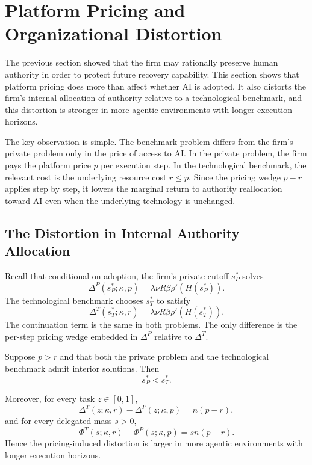 \section{Platform Pricing and Organizational Distortion}
\label{sec:pricing}

The previous section showed that the firm may rationally preserve human authority in order to protect future recovery capability. This section shows that platform pricing does more than affect whether AI is adopted. It also distorts the firm's internal allocation of authority relative to a technological benchmark, and this distortion is stronger in more agentic environments with longer execution horizons.

The key observation is simple. The benchmark problem differs from the firm's private problem only in the price of access to AI. In the private problem, the firm pays the platform price $p$ per execution step. In the technological benchmark, the relevant cost is the underlying resource cost $r\le p$. Since the pricing wedge $p-r$ applies step by step, it lowers the marginal return to authority reallocation toward AI even when the underlying technology is unchanged.

\subsection{The Distortion in Internal Authority Allocation}
\label{subsec:pricing-distortion}

Recall that conditional on adoption, the firm's private cutoff $s_P^\ast$ solves
\[
\Delta^P(s_P^\ast;\kappa,p)=\lambda \nu R \beta \rho'(H(s_P^\ast)).
\]
The technological benchmark chooses $s_T^\ast$ to satisfy
\begin{equation}
\label{eq:FOC-tech-pricing}
\Delta^T(s_T^\ast;\kappa,r)=\lambda \nu R \beta \rho'(H(s_T^\ast)).
\end{equation}
The continuation term is the same in both problems. The only difference is the per-step pricing wedge embedded in $\Delta^P$ relative to $\Delta^T$.

\begin{proposition}
\label{prop:pricing-distortion}
Suppose $p>r$ and that both the private problem and the technological benchmark admit interior solutions. Then
\[
s_P^\ast<s_T^\ast.
\]

Moreover, for every task $z\in[0,1]$,
\[
\Delta^T(z;\kappa,r)-\Delta^P(z;\kappa,p)=n(p-r),
\]
and for every delegated mass $s>0$,
\[
\Phi^T(s;\kappa,r)-\Phi^P(s;\kappa,p)=sn(p-r).
\]
Hence the pricing-induced distortion is larger in more agentic environments with longer execution horizons.
\end{proposition}

